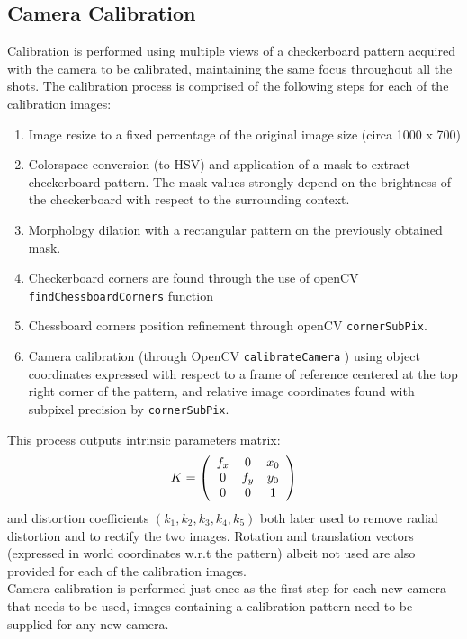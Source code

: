 \documentclass[12pt]{amsart}
\begin{document}
\subsection{Camera Calibration}
Calibration is performed using multiple views of a checkerboard pattern acquired with the camera to be calibrated, maintaining the same focus throughout all the shots.
The calibration process is comprised of the following steps for each of the calibration images:
\begin{enumerate}[label={\arabic*.}]
    \item Image resize to a fixed percentage of the original image size (circa 1000 x 700)
    \item Colorspace conversion (to HSV) and application of a mask to extract checkerboard pattern. 
    The mask values strongly depend on the brightness of the checkerboard with respect to the surrounding context.
    \item Morphology dilation with a rectangular pattern on the previously obtained mask.
    \item Checkerboard corners are found through the use of openCV \texttt{findChessboardCorners} function
    \item Chessboard corners position refinement through openCV \texttt{cornerSubPix}.
    \item Camera calibration (through OpenCV \texttt{calibrateCamera} \cite{calibration}) using object coordinates expressed with respect to a frame of reference centered at the top right corner of the pattern, 
    and relative image coordinates found with subpixel precision by \texttt{cornerSubPix}.
\end{enumerate}
This process outputs intrinsic parameters matrix: \[K = \left ( 
    \begin{array}{ c c c}
    f_x & 0   & x_0 \\
     0  & f_y & y_0 \\
     0  & 0   & 1 \\
    \end{array}
\right )\]
and distortion coefficients \((k_1, k_2, k_3, k_4, k_5)\) both later used to remove radial distortion and to rectify the two images.
Rotation and translation vectors (expressed in world coordinates w.r.t the pattern) albeit not used are also provided for each of the calibration images.
\\
Camera calibration is performed just once as the first step for each new camera that needs to be used, images containing a calibration pattern need to be supplied for any new camera.
\end{document}

